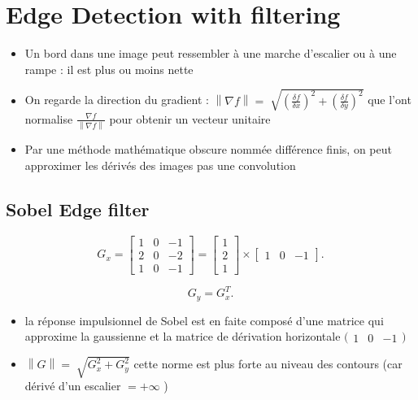 \documentclass{article}
\theoremstyle{plain}%
\theoremstyle{definition}
\theoremstyle{remark}
\begin{document}
\section{Edge Detection with filtering}
\begin{itemize}
    \item Un bord dans une image peut ressembler à une marche d'escalier ou à une rampe : il est plus ou moins nette
    \item On regarde la direction du gradient : $ \left\| \nabla f \right\| = \sqrt[]{(\frac{\delta f}{\delta x})^2 + (\frac{\delta f}{\delta y})^2} $ que l'ont normalise $ \frac{\nabla f}{\left\| \nabla f \right\| } $ pour obtenir un vecteur unitaire
    \item Par une méthode mathématique obscure nommée différence finis, on peut approximer les dérivés des images pas une convolution 
\end{itemize}

\subsection{Sobel Edge filter}
\[
    G_x = \begin{bmatrix}
        1 & 0 & -1 \\
        2 & 0 & -2 \\
        1 & 0 & -1 
    \end{bmatrix} = \begin{bmatrix}
        1 \\
        2 \\
        1
    \end{bmatrix} \times \begin{bmatrix}
        1 & 0 & -1
    \end{bmatrix}
.\]

\[
    G_y = G_x^T
.\]


\begin{itemize}
    \item la réponse impulsionnel de Sobel est en faite composé d'une matrice qui approxime la gaussienne et la matrice de dérivation horizontale $ \big(\begin{smallmatrix}
        1 & 0 & -1
    \end{smallmatrix}\big) $ 
    \item $ \left\| G \right\| = \sqrt[]{G_x^2 + G_y^2} $ cette norme est plus forte au niveau des contours (car dérivé d'un escalier $ = + \infty  $ )
\end{itemize}
\end{document}
